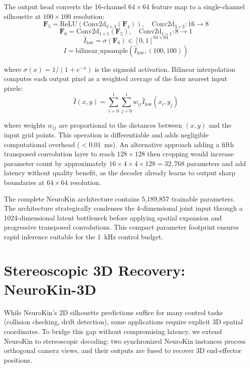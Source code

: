 \documentclass[12pt,a4paper,oneside]{report}
\begin{document}
The output head converts the 16-channel $64 \times 64$ feature map to a single-channel silhouette at $100 \times 100$ resolution:
\begin{equation}\mathbf{F}_5 = \text{ReLU}(\text{Conv2d}_{3\times3}(\mathbf{F}_4)), \quad \text{Conv2d}_{3\times3}: 16 \rightarrow 8
\end{equation}
\begin{equation}\mathbf{F}_6 = \text{Conv2d}_{1\times1}(\mathbf{F}_5), \quad \text{Conv2d}_{1\times1}: 8 \rightarrow 1
\end{equation}
\begin{equation}\hat{I}_{\text{low}} = \sigma(\mathbf{F}_6) \in [0, 1]^{64 \times 64}
\end{equation}
\begin{equation}\hat{I} = \text{bilinear\_upsample}(\hat{I}_{\text{low}}, (100, 100))
\end{equation}

where $\sigma(x) = 1/(1 + e^{-x})$ is the sigmoid activation. Bilinear interpolation computes each output pixel as a weighted average of the four nearest input pixels:
\begin{equation}\hat{I}(x,y) = \sum_{i=0}^{1}\sum_{j=0}^{1} w_{ij} \hat{I}_{\text{low}}(x_i, y_j)
\end{equation}

where weights $w_{ij}$ are proportional to the distances between $(x,y)$ and the input grid points. This operation is differentiable and adds negligible computational overhead ($<0.01$~ms). An alternative approach adding a fifth transposed convolution layer to reach $128 \times 128$ then cropping would increase parameter count by approximately $16 \times 4 \times 4 \times 128 = 32,768$ parameters and add latency without quality benefit, as the decoder already learns to output sharp boundaries at $64 \times 64$ resolution.

The complete NeuroKin architecture contains 5,189,857 trainable parameters. The architecture strategically condenses the 4-dimensional joint input through a 1024-dimensional latent bottleneck before applying spatial expansion and progressive transposed convolutions. This compact parameter footprint ensures rapid inference suitable for the 1~kHz control budget.
\section{Stereoscopic 3D Recovery: NeuroKin-3D}

While NeuroKin's 2D silhouette predictions suffice for many control tasks (collision checking, drift detection), some applications require explicit 3D spatial coordinates. To bridge this gap without compromising latency, we extend NeuroKin to stereoscopic decoding: two synchronized NeuroKin instances process orthogonal camera views, and their outputs are fused to recover 3D end-effector positions.
\end{document}
